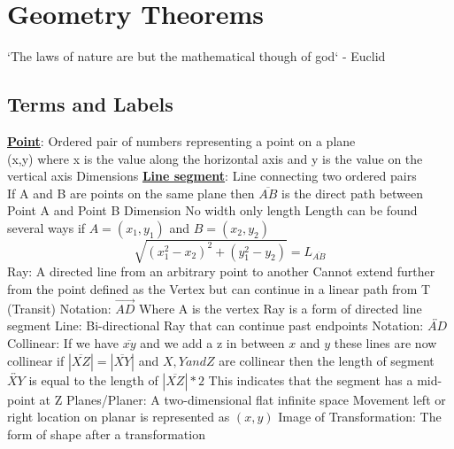\documentclass[12pt]{article}
\newcommand{\defline}[2]{\noindent\textbf{\underline{#1}}: #2\\}
\begin{document}
    \section {Geometry Theorems}
        `The laws of nature are but the mathematical though of god` - Euclid
        \subsection{Terms and Labels}
        \begin{outline}[enumerate]
            \1 \defline{Point}{Ordered pair of numbers representing a point on a plane}
                \2 (x,y) where x is the value along the horizontal axis and y is the value on the vertical axis
                 Dimensions
            \1 \defline{Line segment}{Line connecting two ordered pairs}
                \2 If A and B are points on the same plane then $\overline{AB}$ is the direct path between Point A and Point B
                 Dimension
                \2 No width only length
                \2 Length can be found several ways
                    \3 if $A = (x_1, y_1)$ and $B = (x_2, y_2)$
                    \begin{equation}
                        \sqrt{(x_1^2 - x_2)^2 + (y_1^2 - y_2)} = L_{\overline{AB}}
                    \end{equation}
            \1 Ray: A directed line from an arbitrary point to another
                \2 Cannot extend further from the point defined as the Vertex but can continue in a linear path from T (Transit)
                \2 Notation: $\overrightarrow{AD}$ Where A is the vertex
                \2 Ray is a form of directed line segment
            \1 Line: Bi-directional Ray that can continue past endpoints
                \2 Notation: $\overleftrightarrow{AD}$
            \1 Collinear: If we have $\overline{xy}$ and we add a z in between $x$ and $y$ these lines are now collinear
                \2 if $|\overline{XZ}| = |\overline{XY}|$ and $X, Y and Z$ are collinear then the
                length of segment $\overleftrightarrow{XY}$ is equal to the length of $|\overline{XZ}| * 2$
                \2 This indicates that the segment has a mid-point at Z
            \1 Planes/Planer: A two-dimensional flat infinite space
                \2 Movement left or right location on planar is represented as $(x, y)$
            \1 Image of Transformation: The form of shape after a transformation
        \end{outline}
\end{document}
